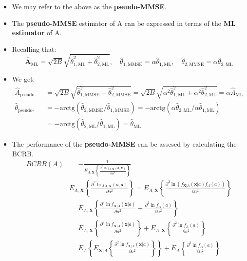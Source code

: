 \begin{itemize}
$$
\mathbf{\hat{A}}_{\text{ML}} = \sqrt{2B}\sqrt{\hat{\theta}_{1,\text{ML}}^{2} + \hat{\theta}_{2,\text{ML}}^{2}}, \quad \text{but }\quad \mathbf{\hat{A}}_{\text{MMSE}} \neq \sqrt{2B}\sqrt{\hat{\theta}_{1,\text{MMSE}}^{2} + \hat{\theta}_{2,\text{MMSE}}^{2}}
$$
\item We may refer to the above as the \textbf{pseudo-MMSE}.
\item The \textbf{pseudo-MMSE} estimator of A can be expressed in terms of the \textbf{ML estimator} of A.
\item Recalling that:
$$
\mathbf{\hat{A}}_{\text{ML}} = \sqrt{2B}\sqrt{\hat{\theta}_{1,\text{ML}}^{2} + \hat{\theta}_{2,\text{ML}}^{2}}, \quad \hat{\theta}_{1,\text{MMSE}} = \alpha\hat{\theta}_{1,\text{ML}}, \quad \hat{\theta}_{2,\text{MMSE}} = \alpha\hat{\theta}_{2,\text{ML}}
$$
\item We get:
\begin{align*}
\hat{A}_{\text{pseudo-MMSE}} &= \sqrt{2B}\sqrt{\hat{\theta}_{1,\text{MMSE}}^{2} + \hat{\theta}_{2,\text{MMSE}}^{2}} = \sqrt{2B}\sqrt{\alpha^{2}\hat{\theta}_{1,\text{ML}}^{2} + \alpha^{2}\hat{\theta}_{2,\text{ML}}^{2}} = \alpha\hat{A}_{\text{ML}} \\[4pt]
\hat{\theta}_{\text{pseudo-MMSE}} &= -\text{arctg}\left(\hat{\theta}_{2,\text{MMSE}} / \hat{\theta}_{1,\text{MMSE}}\right) = -\text{arctg}\left(\alpha\hat{\theta}_{2,\text{ML}} / \alpha\hat{\theta}_{1,\text{ML}}\right) \\[4pt]
&= -\text{arctg}\left(\hat{\theta}_{2,\text{ML}} / \hat{\theta}_{1,\text{ML}}\right) = \hat{\theta}_{\text{ML}}
\end{align*}

\item The performance of the \textbf{pseudo-MMSE} can be assesed by calculating the BCRB.
\begin{align*}
BCRB(A) &= - \frac{1}{E_{A,\mathbf{X}}\left\{\frac{\partial^2 \ln f_{A,\mathbf{X}}(a,\mathbf{x})}{\partial a^2}\right\}} \\[10pt]
&E_{A,\mathbf{X}}\left\{\frac{\partial^2 \ln f_{A,\mathbf{X}}(a,\mathbf{x})}{\partial a^2}\right\} = E_{A,\mathbf{X}}\left\{\frac{\partial^2 \ln \left(f_{\mathbf{X}|A}(\mathbf{x}|a)f_{A}(a)\right)}{\partial a^2}\right\} \\[4pt]
&= E_{A,\mathbf{X}}\left\{\frac{\partial^2 \ln f_{\mathbf{X}|A}(\mathbf{x}|a)}{\partial a^2} + \frac{\partial^2 \ln f_{A}(a)}{\partial a^2}\right\} \\[4pt]
&= E_{A,\mathbf{X}}\left\{\frac{\partial^2 \ln f_{\mathbf{X}|A}(\mathbf{x}|a)}{\partial a^2}\right\} + E_{A,\mathbf{X}}\left\{\frac{\partial^2 \ln f_{A}(a)}{\partial a^2}\right\} \\[4pt]
&= E_{A}\left\{E_{\mathbf{X}|A}\left\{\frac{\partial^2 \ln f_{\mathbf{X}|A}(\mathbf{x}|a)}{\partial a^2}\right\}\right\} + E_{A}\left\{\frac{\partial^2 \ln f_{A}(a)}{\partial a^2}\right\}
\end{align*}


\end{itemize}
